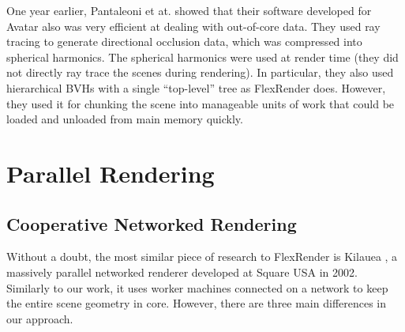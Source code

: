 \documentclass[12pt]{ucthesis}
\begin{document}
One year earlier, Pantaleoni et at. \cite{pantaleoni:2010} showed that their
software developed for Avatar also was very efficient at dealing with out-of-core
data. They used ray tracing to generate directional occlusion data, which was
compressed into spherical harmonics. The spherical harmonics were used at render
time (they did not directly ray trace the scenes during rendering). In particular,
they also used hierarchical BVHs with a single ``top-level'' tree as FlexRender
does. However, they used it for chunking the scene into manageable units of work
that could be loaded and unloaded from main memory quickly.

\section{Parallel Rendering}
\label{parallelbg}

\subsection{Cooperative Networked Rendering}
\label{networked}

Without a doubt, the most similar piece of research to FlexRender is Kilauea
\cite{kato:2002}, a massively parallel networked renderer developed at Square
USA in 2002. Similarly to our work, it uses worker machines connected on a
network to keep the entire scene geometry in core. However, there are three
main differences in our approach.
\end{document}
